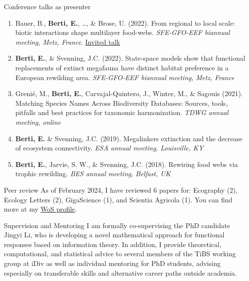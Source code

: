 \documentclass{resume} %
\begin{document}
\begin{rSection}{Conference talks as presenter}
\begin{enumerate}[leftmargin=0pt]
    \setcounter{enumi}{0}
    \itemsep-1ex
    \item{Bauer, B., \textbf{Berti, E.}, \dots, \& Brose, U. (2022). From regional to local scale: biotic interactions shape multilayer food-webs. \textit{SFE-GFO-EEF biannual meeting, Metz, France}. \underline{Invited talk}}
    \item{\textbf{Berti, E.}, \& Svenning, J.C. (2022). State-space models show that functional replacements of extinct megafauna have distinct habitat preference in a European rewilding area. \textit{SFE-GFO-EEF biannual meeting, Metz, France}}
    \item{Grenié, M., \textbf{Berti, E.}, Carvajal-Quintero, J., Winter, M., \& Sagouis (2021). Matching Species Names Across Biodiversity Databases: Sources, tools, pitfalls and best practices for taxonomic harmonization. \textit{TDWG annual meeting, online}}
    \item{\textbf{Berti, E.} \& Svenning, J.C. (2019). Megalinkers extinction and the decrease of ecosystem connectivity. \textit{ESA annual meeting, Louisville, KY}}
    \item{\textbf{Berti, E.}, Jarvie, S. W., \& Svenning, J.C. (2018). Rewiring food webs via trophic rewilding. \textit{BES annual meeting, Belfast, UK}}
\end{enumerate}
\end{rSection}

\begin{rSection}{Peer review}
As of February 2024, I have reviewed 6 papers for: Ecography (2), Ecology Letters (2), GigaScience (1), and Scientia Agricola (1). You can find more at my \href{https://www.webofscience.com/wos/author/record/2190178}{WoS profile}.
\end{rSection}

\begin{rSection}{Supervision and Mentoring}
I am formally co-supervising the PhD candidate Jingyi Li, who is developing a novel mathematical approach for functional responses based on information theory. 
In addition, I provide theoretical, computational, and statistical advice to several members of the TiBS working group at iDiv as well as individual mentoring for PhD students, advising especially on transferable skills and alternative career paths outside academia.
\end{rSection}
\end{document}
